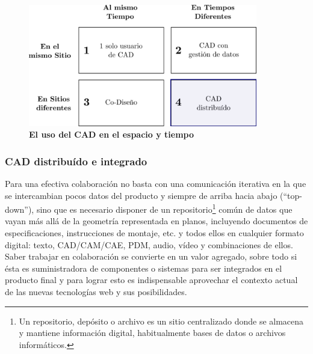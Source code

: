 \begin{figure}[h]
\includegraphics[width=10cm]{Img/CPD/cad-time.png}
\centering
\caption{\textbf{\footnotesize{El uso del CAD en el espacio y tiempo}}}
\label{fig:tablacad}
\end{figure}

\subsubsection{CAD distribuído e integrado}
Para una efectiva colaboración no basta con una comunicación iterativa en la que se intercambian pocos datos del producto y siempre de arriba hacia abajo (“top-down”), sino que es necesario disponer de un repositorio\footnote{Un repositorio, depósito o archivo es un sitio centralizado donde se almacena y mantiene información digital, habitualmente bases de datos o archivos informáticos.} común de datos que vayan más allá de la geometría representada en planos, incluyendo documentos de especificaciones, instrucciones de montaje, etc. y todos ellos en cualquier formato digital: texto, CAD/CAM/CAE, PDM, audio, vídeo y combinaciones de ellos.
Saber trabajar en colaboración se convierte en un valor agregado, sobre todo si ésta es suministradora de componentes o sistemas para ser integrados en el producto final y para lograr esto es indispensable aprovechar el contexto actual de las nuevas tecnologías web y sus posibilidades. \citep{Ruiz}


